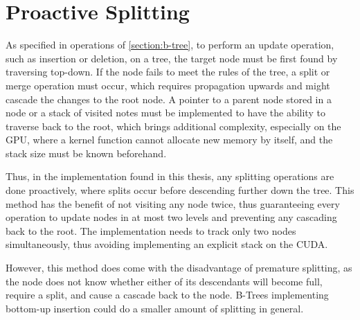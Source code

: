 \section{Proactive Splitting}

As specified in operations of \cref{section:b-tree}, to perform an update operation, such as insertion or deletion, on a tree, the target node must be first found by traversing top-down. If the node fails to meet the rules  of the tree, a split or merge operation must occur, which requires propagation upwards and might cascade the changes to the root node. A pointer to a parent node stored in a node or a stack of visited notes must be implemented to have the ability to traverse back to the root, which brings additional complexity, especially on the GPU, where a kernel function cannot allocate new memory by itself, and the stack size must be known beforehand.

Thus, in the implementation found in this thesis, any splitting operations are done proactively, where splits occur before descending further down the tree. This method has the benefit of not visiting any node twice, thus guaranteeing every operation to update nodes in at most two levels and preventing any cascading back to the root. The implementation needs to track only two nodes simultaneously, thus avoiding implementing an explicit stack on the CUDA.

However, this method does come with the disadvantage of premature splitting, as the node does not know whether either of its descendants will become full, require a split, and cause a cascade back to the node. B-Trees implementing bottom-up insertion could do a smaller amount of splitting in general.
